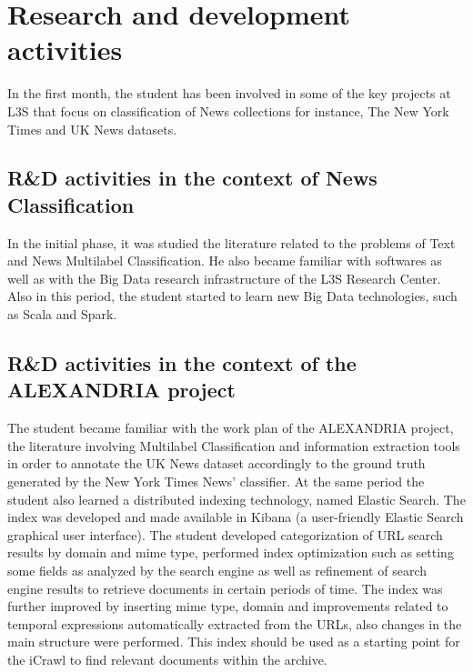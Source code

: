 \documentclass[a4paper,11pt]{report}
\begin{document}
\section{Research and development activities}

In the first month, the student has been involved in some of the key projects
at L3S that focus on classification of News collections for instance, The New
York Times and UK News datasets.

\subsection{R\&D activities in the context of News Classification}
In the initial phase, it was studied the literature related to the 
problems of Text and News Multilabel Classification.
He also became familiar with softwares as well as 
with the Big Data research infrastructure of the L3S Research Center. 
Also in this period, the student started to learn new Big Data technologies, 
such as Scala and Spark.
%
\subsection{R\&D activities in the context of the ALEXANDRIA project}
The student became familiar with the work plan of the ALEXANDRIA
project, the literature involving Multilabel Classification and information
extraction tools in order to annotate the UK News dataset accordingly to the
ground truth generated by the New York Times News' classifier.
%
At the same period the student also learned a distributed indexing technology, named Elastic
Search. The index was
developed and made available in Kibana (a user-friendly Elastic Search graphical user
interface). 
%
The student developed categorization of 
URL search results by domain and mime type, performed index optimization such as setting some fields as analyzed 
by the search engine as well as refinement of search engine results to retrieve documents in certain 
periods of time. 
%
The index was further improved by inserting mime type, domain and
improvements related to temporal expressions automatically 
extracted from the URLs, also changes in the main
structure were performed. This index should be used as a starting point for the iCrawl
to find relevant documents within the archive. 
\end{document}
